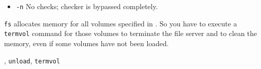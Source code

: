 \begin{man}
\begin{itemize}
\begin{itemize}
               \item {\tt -n}\newline
                 No checks; checker is bypassed completely.

               \end{itemize}
             \end{itemize}

             \begin{note}
               {\tt fs} allocates memory for all volumes specified in \DI. So you
               have to execute a {\tt termvol} command for those volumes to terminate
               the file server and to clean the memory, even if some volumes have
               not been loaded.
             \end{note}

  , {\tt unload}, {\tt termvol}
\end{man}

